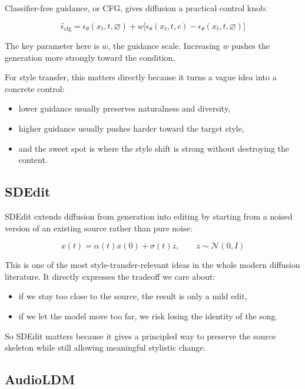 \documentclass[11pt]{article}
\begin{document}
Classifier-free guidance, or CFG, gives diffusion a practical control knob:

\begin{equation*}
\hat{\epsilon}_{\mathrm{cfg}}=
\epsilon_{\theta}(x_t,t,\varnothing)+
w\bigl[\epsilon_{\theta}(x_t,t,c)-\epsilon_{\theta}(x_t,t,\varnothing)\bigr]
\end{equation*}

The key parameter here is \(w\), the guidance scale. Increasing \(w\) pushes the generation more strongly toward the condition.

For style transfer, this matters directly because it turns a vague idea into a concrete control:

\begin{itemize}
\item lower guidance usually preserves naturalness and diversity,
\item higher guidance usually pushes harder toward the target style,
\item and the sweet spot is where the style shift is strong without destroying the content.
\end{itemize}

\subsection{SDEdit}

SDEdit extends diffusion from generation into editing by starting from a noised version of an existing source rather than pure noise:

\begin{equation*}
x(t)=\alpha(t)x(0)+\sigma(t)z,\qquad z\sim\mathcal{N}(0,I)
\end{equation*}

This is one of the most style-transfer-relevant ideas in the whole modern diffusion literature. It directly expresses the tradeoff we care about:

\begin{itemize}
\item if we stay too close to the source, the result is only a mild edit,
\item if we let the model move too far, we risk losing the identity of the song.
\end{itemize}

So SDEdit matters because it gives a principled way to preserve the source skeleton while still allowing meaningful stylistic change.

\subsection{AudioLDM}
\end{document}
